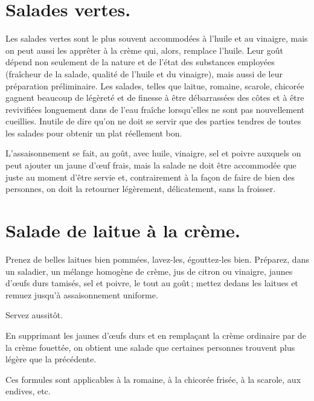 \section*{\centering Salades vertes.}
{}

Les salades vertes sont le plus souvent accommodées à l'huile et au vinaigre,
mais on peut aussi les apprêter à la crème qui, alors, remplace l'huile. Leur
goût dépend non seulement de la nature et de l'état des substances employées
(fraîcheur de la salade, qualité de l'huile et du vinaigre), mais aussi de leur
préparation préliminaire. Les salades, telles que laitue, romaine, scarole,
chicorée gagnent beaucoup de légèreté et de finesse à être débarrassées des
côtes et à être revivifiées longuement dans de l’eau fraîche lorsqu'elles ne
sont pas nouvellement cueillies. Inutile de dire qu'on ne doit se servir que
des parties tendres de toutes les salades pour obtenir un plat réellement bon.

L'assaisonnement se fait, au goût, avec huile, vinaigre, sel et poivre auxquels
on peut ajouter un jaune d'œuf frais, mais la salade ne doit être accommodée
que juste au moment d'être servie et, contrairement à la façon de faire de bien
des personnes, on doit la retourner légèrement, délicatement, sans la froisser.

\section*{\centering Salade de laitue à la crème.}
{}

Prenez de belles laitues bien pommées, lavez-les, égouttez-les bien. Préparez,
dans un saladier, un mélange homogène de crème, jus de citron ou vinaigre,
jaunes d'œufs durs tamisés, sel et poivre, le tout au goût ; mettez dedans les
laitues et remuez jusqu'à assaisonnement uniforme.

Servez aussitôt.

\sk

En supprimant les jaunes d'œufs durs et en remplaçant la crème ordinaire par
de la crème fouettée, on obtient une salade que certaines personnes trouvent plus
légère que la précédente.

\sk

Ces formules sont applicables à la romaine, à la chicorée frisée, à la scarole,
aux endives, etc.

